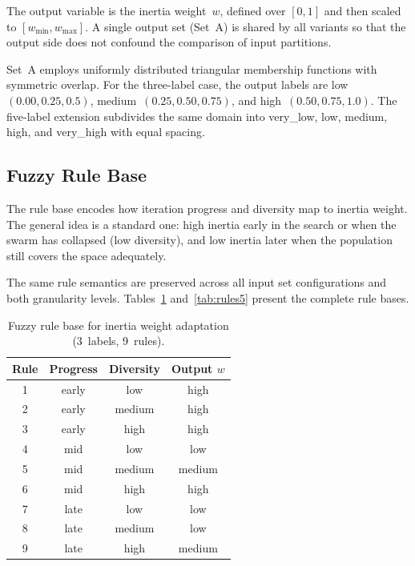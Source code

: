 \documentclass[conference]{IEEEtran}
\begin{document}
The output variable is the inertia weight~$w$, defined over $[0, 1]$ and then scaled to $[w_{\min}, w_{\max}]$. A single output set (Set~A) is shared by all variants so that the output side does not confound the comparison of input partitions.

Set~A employs uniformly distributed triangular membership functions with symmetric overlap. For the three-label case, the output labels are low~$(0.00, 0.25, 0.5)$, medium~$(0.25, 0.50, 0.75)$, and high~$(0.50, 0.75, 1.0)$. The five-label extension subdivides the same domain into very\_low, low, medium, high, and very\_high with equal spacing.

\subsection{Fuzzy Rule Base}
\label{subsec:rule_base}

The rule base encodes how iteration progress and diversity map to inertia weight. The general idea is a standard one: high inertia early in the search or when the swarm has collapsed (low diversity), and low inertia later when the population still covers the space adequately.

The same rule semantics are preserved across all input set configurations and both granularity levels. Tables~\ref{tab:rules3} and~\ref{tab:rules5} present the complete rule bases.

\begin{table}[htbp]
\caption{Fuzzy rule base for inertia weight adaptation (3~labels, 9~rules).}
\label{tab:rules3}
\centering
\begin{tabular}{@{}cccc@{}}
\toprule
Rule & Progress & Diversity & Output $w$ \\ \midrule
1    & early    & low       & high   \\
2    & early    & medium    & high   \\
3    & early    & high      & high   \\\midrule
4    & mid      & low       & low    \\
5    & mid      & medium    & medium \\
6    & mid      & high      & high   \\\midrule
7    & late     & low       & low    \\
8    & late     & medium    & low    \\
9    & late     & high      & medium \\ \bottomrule
\end{tabular}
\end{table}
\end{document}
